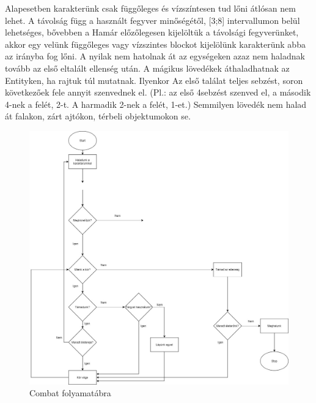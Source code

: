 
Alapesetben karakterünk csak függőleges és vízszíntesen tud lőni átlósan nem lehet. A távolság függ a használt fegyver minőségétől, [3;8] intervallumon belül lehetséges, bővebben a %
Hamár előzőlegesen kijelöltük a távolsági fegyverünket, akkor egy velünk függőleges vagy vízszintes blockot kijelölünk karakterünk abba az irányba fog lőni.
A nyilak nem hatolnak át az egységeken azaz nem haladnak tovább az első eltalált ellenség után.
A mágikus lövedékek áthaladhatnak az Entityken, ha rajtuk túl mutatnak. Ilyenkor Az első találat teljes sebzést, soron következőek fele annyit szenvednek el. (Pl.: az első 4sebzést szenved el, a második 4-nek a felét, 2-t. A harmadik 2-nek a felét, 1-et.)
Semmilyen lövedék nem halad át falakon, zárt ajtókon, térbeli objektumokon se.


\begin{figure}[!ht]
	\centering
	\includegraphics[width=\textwidth]{images/image5.png}
	\caption{Combat folyamatábra}
	\label{fig:combat2}
\end{figure}

